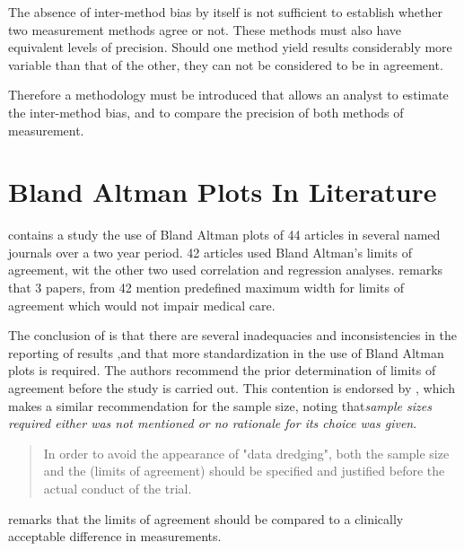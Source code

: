 \documentclass[12pt, a4paper]{report}
\theoremstyle{plain}
\theoremstyle{definition}
\theoremstyle{remark}
\begin{document}
	\bigskip
	
	\noindent The absence of inter-method bias by itself is not
	sufficient to establish whether two measurement methods agree or
	not. These methods must also have equivalent levels of precision.
	Should one method yield results considerably more variable than
	that of the other, they can not be considered to be in agreement.
	
	Therefore a methodology must be introduced that allows an analyst
	to estimate the inter-method bias, and to compare the precision of
	both methods of measurement.
	\newpage
	\section{Bland Altman Plots In Literature}
	\citet{mantha} contains a study the use of Bland Altman plots of
	44 articles in several named journals over a two year period. 42
	articles used Bland Altman's limits of agreement, wit the other
	two used correlation and regression analyses. \citet{mantha}
	remarks that 3 papers, from 42 mention predefined maximum width
	for limits of agreement which would not impair medical care.
	
	The conclusion of \citet{mantha} is that there are several
	inadequacies and inconsistencies in the reporting of results ,and
	that more standardization in the use of Bland Altman plots is
	required. The authors recommend the prior determination of limits
	of agreement before the study is carried out. This contention is
	endorsed by \citet{lin}, which makes a similar recommendation for
	the sample size, noting that\emph{sample sizes required either was
		not mentioned or no rationale for its choice was given}.
	
	\begin{quote}
		In order to avoid the appearance of "data dredging", both the
		sample size and the (limits of agreement) should be specified and
		justified before the actual conduct of the trial. \citep{lin}
	\end{quote}
	
	\citet{Dewitte} remarks that the limits of agreement should be
	compared to a clinically acceptable difference in measurements.
	
\end{document}
